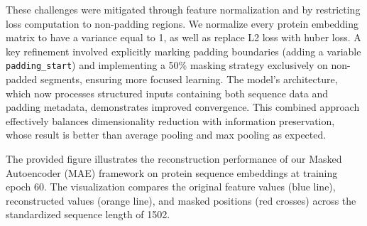 \documentclass{article}
\begin{document}
	 These challenges were mitigated through feature normalization and by restricting loss computation to non-padding regions. We normalize every protein embedding matrix to have a variance equal to 1, as well as replace L2 loss with huber loss. A key refinement involved explicitly marking padding boundaries (adding a variable \texttt{padding\_start}) and implementing a 50\% masking strategy exclusively on non-padded segments, ensuring more focused learning. The model's architecture, which now processes structured inputs containing both sequence data and padding metadata, demonstrates improved convergence. This combined approach effectively balances dimensionality reduction with information preservation, whose result is better than average pooling and max pooling as expected.
	
The provided figure illustrates the reconstruction performance of our Masked Autoencoder (MAE) framework on protein sequence embeddings at training epoch 60. The visualization compares the original feature values (blue line), reconstructed values (orange line), and masked positions (red crosses) across the standardized sequence length of 1502.

%		
%		
%		
%		
\end{document}
